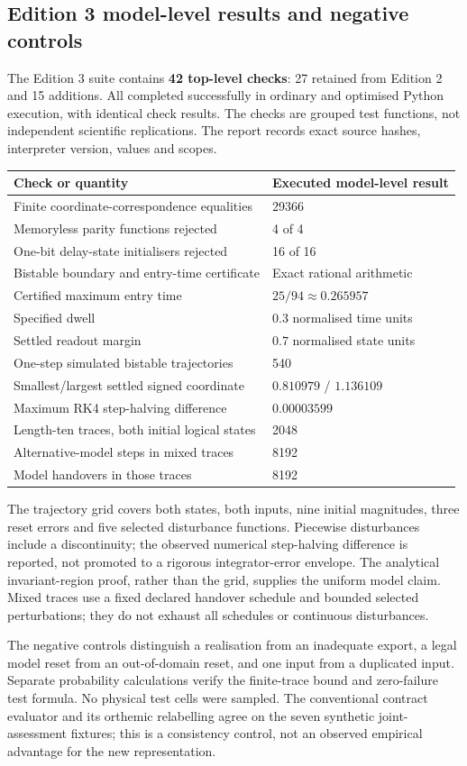 \subsection{Edition 3 model-level results and negative controls}
The Edition 3 suite contains \textbf{42 top-level checks}: 27 retained from Edition 2 and 15 additions. All completed successfully in ordinary and optimised Python execution, with identical check results. The checks are grouped test functions, not independent scientific replications. The report records exact source hashes, interpreter version, values and scopes.

\begin{center}\small
\begin{tabular}{@{}p{}p{}@{}}\toprule
Check or quantity & Executed model-level result\\\midrule
Finite coordinate-correspondence equalities & 29366\\
Memoryless parity functions rejected & 4 of 4\\
One-bit delay-state initialisers rejected & 16 of 16\\
Bistable boundary and entry-time certificate & Exact rational arithmetic\\
Certified maximum entry time & $25/94\approx0.265957$\\
Specified dwell & $0.3$ normalised time units\\
Settled readout margin & $0.7$ normalised state units\\
One-step simulated bistable trajectories & 540\\
Smallest/largest settled signed coordinate & $0.810979$ / $1.136109$\\
Maximum RK4 step-halving difference & $0.00003599$\\
Length-ten traces, both initial logical states & 2048\\
Alternative-model steps in mixed traces & 8192\\
Model handovers in those traces & 8192\\\bottomrule
\end{tabular}
\end{center}

The trajectory grid covers both states, both inputs, nine initial magnitudes, three reset errors and five selected disturbance functions. Piecewise disturbances include a discontinuity; the observed numerical step-halving difference is reported, not promoted to a rigorous integrator-error envelope. The analytical invariant-region proof, rather than the grid, supplies the uniform model claim. Mixed traces use a fixed declared handover schedule and bounded selected perturbations; they do not exhaust all schedules or continuous disturbances.

The negative controls distinguish a realisation from an inadequate export, a legal model reset from an out-of-domain reset, and one input from a duplicated input. Separate probability calculations verify the finite-trace bound and zero-failure test formula. No physical test cells were sampled. The conventional contract evaluator and its orthemic relabelling agree on the seven synthetic joint-assessment fixtures; this is a consistency control, not an observed empirical advantage for the new representation.
